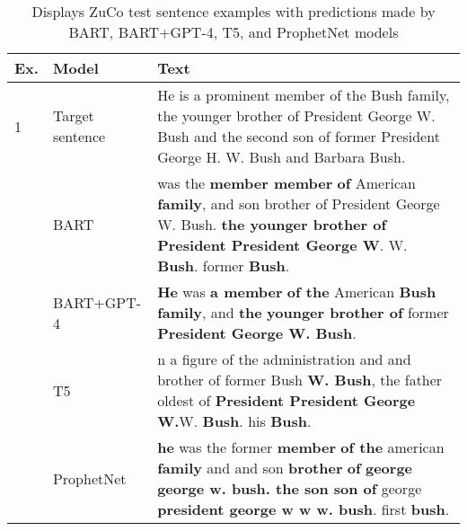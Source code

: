 \documentclass[journal]{IEEEtran}
\begin{document}
\begin{table*}[!htbp]
	\renewcommand{\arraystretch}{1.3}
	\caption{\large Displays ZuCo test sentence examples with predictions made by BART, BART+GPT-4, T5, and ProphetNet models}
	\label{tab:Table_of_examples}
	\centering
	\fontsize{11pt}{12pt}\selectfont
	\begin{tabular}{|p{}|p{}|p{}|}
		\hline
		\textbf{Ex.} & \textbf{Model}  & \textbf{Text}                                                                                                                                                                                                                                                                                                                  \\
		\hline
		1            & Target sentence & He is a prominent member of the Bush family, the younger brother of President George W. Bush and the second son of former President George H. W. Bush and Barbara Bush.                                                                                                                                                        \\ \cline{2-3}
		             & BART            & was the \textbf{member member} \textbf{of} American \textbf{family}, and son brother of President George W. Bush. \textbf{the younger brother of President President George W}. W. \textbf{Bush}. former \textbf{Bush}.                                                                                                        \\ \cline{2-3}
		             & BART+GPT-4      & \textbf{He} was \textbf{a member} \textbf{of the} American \textbf{Bush family}, and \textbf{the} \textbf{younger brother of} former \textbf{President George W. Bush}.                                                                                                                                                        \\ \cline{2-3}
		             & T5              & n a figure of the administration and and brother of former Bush \textbf{W. Bush}, the father oldest of \textbf{President President George W.}W. \textbf{Bush}. his \textbf{Bush}.                                                                                                                                              \\ \cline{2-3}
		             & ProphetNet      & \textbf{he} was the former \textbf{member} \textbf{of the} american \textbf{family} and and son \textbf{brother} \textbf{of} \textbf{george george w. bush. the son son of} george \textbf{president george w w w. bush}. first \textbf{bush}.                                                                                 \\ \hline
		

\end{tabular}
\end{table*}
\end{document}
